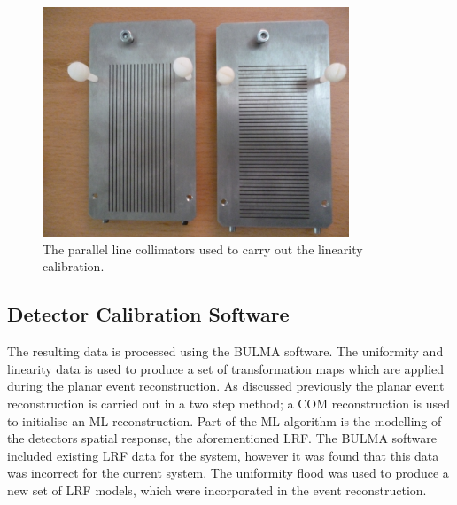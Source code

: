 \begin{figure}[!t]
\centering
\includegraphics[width=3.6in]{figures/P1020277.JPG}

    \caption{The parallel line collimators used to carry out the linearity calibration.} \label{fig:LinColl}
\end{figure}

\subsection{Detector Calibration Software}
The resulting data is processed using the BULMA software. The uniformity and linearity data is used to produce a set of transformation maps which are applied during the planar event reconstruction. As discussed previously the planar event reconstruction is carried out in a two step method; a \acrshort{COM} reconstruction is used to initialise an \acrshort{ML} reconstruction. Part of the \acrshort{ML} algorithm is the modelling of the detectors spatial response, the aforementioned \acrshort{LRF}. The BULMA software included existing \acrshort{LRF} data for the system, however it was found that this data was incorrect for the current system. The uniformity flood was used to produce a new set of \acrshort{LRF} models, which were incorporated in the event reconstruction.
